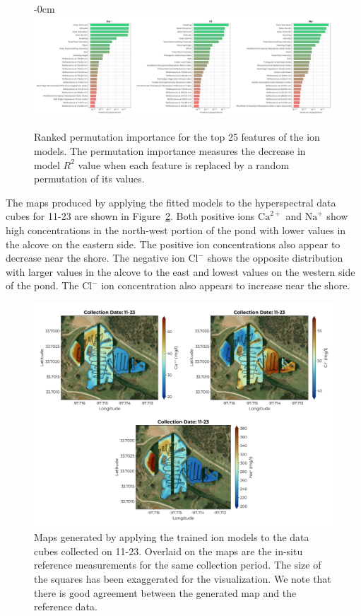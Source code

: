 \documentclass[sensors,article,submit,pdftex,moreauthors]{Definitions/mdpi}
\begin{document}
\begin{figure}
\begin{adjustwidth}{-\extralength}{0cm}
\centering
\includegraphics[width=18 cm]{paper/figures/results/fits/ions-ranking.pdf}
\end{adjustwidth}
\caption{Ranked permutation importance for the top 25 features of the ion models. The permutation importance measures the decrease in model $R^2$ value when each feature is replaced by a random permutation of its values.\label{fig:ions-fi}}
\end{figure}  

The maps produced by applying the fitted models to the hyperspectral data cubes for 11-23 are shown in Figure~\ref{fig:map-ions}. Both positive ions $\mathrm{Ca}^{2+}$ and $\mathrm{Na}^{+}$ show high concentrations in the north-west portion of the pond with lower values in the alcove on the eastern side. The positive ion concentrations also appear to decrease near the shore. The negative ion $\mathrm{Cl}^{-}$ shows the opposite distribution with larger values in the alcove to the east and lowest values on the western side of the pond. The $\mathrm{Cl}^{-}$ ion concentration also appears to increase near the shore.

\begin{figure}
\centering
\includegraphics[width=\columnwidth]{paper/figures/results/maps/ions.pdf}
\caption{Maps generated by applying the trained ion models to the data cubes collected on 11-23. Overlaid on the maps are the in-situ reference measurements for the same collection period. The size of the squares has been exaggerated for the visualization. We note that there is good agreement between the generated map and the reference data. \label{fig:map-ions}}
\end{figure}  
\end{document}
